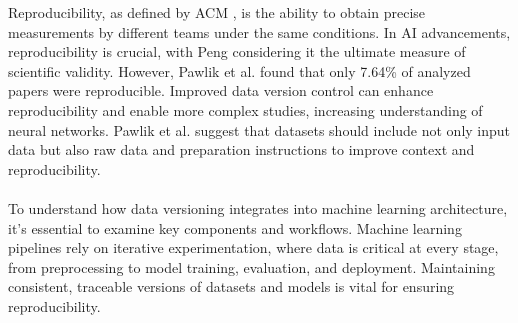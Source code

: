 
Reproducibility, as defined by ACM \cite{ACMreproducibility}, 
is the ability to obtain precise measurements by different 
teams under the same conditions. In AI advancements, reproducibility 
is crucial, with Peng \cite{peng2011reproducible} considering it 
the ultimate measure of scientific validity. However, Pawlik et 
al. \cite{pawlik2019link} found that only 7.64\% of analyzed papers 
were reproducible. Improved data version control can enhance 
reproducibility and enable more complex studies, increasing understanding 
of neural networks. Pawlik et al. \cite{pawlik2019link} suggest that 
datasets should include not only input data but also raw data and 
preparation instructions to improve context and reproducibility. 
\\\\
To understand how data versioning integrates into machine learning 
architecture, it's essential to examine key components and workflows. 
Machine learning pipelines rely on iterative experimentation, where 
data is critical at every stage, from preprocessing to model training, 
evaluation, and deployment. Maintaining consistent, traceable versions 
of datasets and models is vital for ensuring reproducibility. 
\cite{wandb}